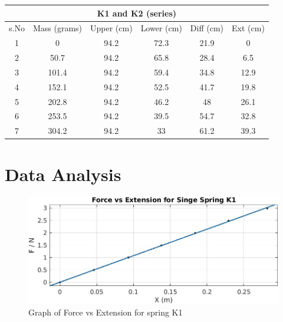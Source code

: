 \begin{center}
\begin{tabular}{|c|c|c|c|c|c|}
\hline
\multicolumn{6}{|c|}{\textbf{K1 and K2 (series)}}                                   \\ \hline
s.No & Mass   (grams) & Upper   (cm) & Lower   (cm) & Diff     (cm) & Ext      (cm) \\ \hline
1    & 0              & 94.2         & 72.3         & 21.9          & 0             \\ \hline
2    & 50.7           & 94.2         & 65.8         & 28.4          & 6.5           \\ \hline
3    & 101.4          & 94.2         & 59.4         & 34.8          & 12.9          \\ \hline
4    & 152.1          & 94.2         & 52.5         & 41.7          & 19.8          \\ \hline
5    & 202.8          & 94.2         & 46.2         & 48            & 26.1          \\ \hline
6    & 253.5          & 94.2         & 39.5         & 54.7          & 32.8          \\ \hline
7    & 304.2          & 94.2         & 33           & 61.2          & 39.3          \\ \hline
\end{tabular}
\end{center}


\section{Data Analysis}
\begin{center}
\begin{figure}[h!]
    \centering
    \includegraphics[width=\textwidth]{figures/K1.jpg}
    \caption{Graph of Force vs Extension for spring K1}
    \label{fig:k1}
\end{figure}
\end{center}


